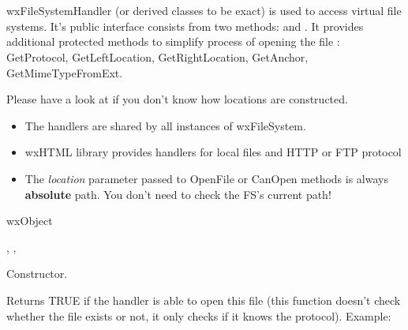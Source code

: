 %
%

\section{}\label{wxfilesystemhandler}

wxFileSystemHandler (or derived classes to be exact) is used
to access virtual file systems. It's public interface consists
from two methods: 
and . 
It provides additional protected methods to simplify process
of opening the file : GetProtocol, GetLeftLocation, GetRightLocation,
GetAnchor, GetMimeTypeFromExt.

Please have a look at  if you don't know how locations
are constructed.


\begin{itemize}
\item The handlers are shared by all instances of wxFileSystem.

\item wxHTML library provides handlers for local files and HTTP or FTP protocol

\item The {\it location} parameter passed to OpenFile or CanOpen methods
is always {\bf absolute} path. You don't need to check the FS's current path!
\end{itemize}


wxObject


,
,

\label{wxfilesystemhandlerwxfilesystemhandler}


Constructor.

\label{wxfilesystemhandlercanopen}


Returns TRUE if the handler is able to open this file (this function doesn't
check whether the file exists or not, it only checks if it knows the protocol).
Example:

